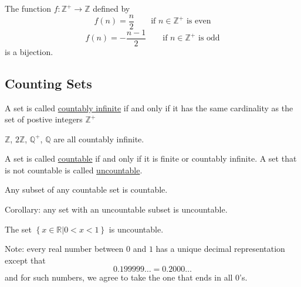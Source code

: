 The function $f:\mathbb Z^+ \rightarrow \mathbb Z$ defined by $$f(n) = \frac{n}{2}\qquad \text{if $n\in\mathbb Z^+$ is even}$$ $$f(n) = -\frac{n-1}{2}\qquad \text{if $n\in\mathbb Z^+$ is odd}$$ is a bijection.

\subsection{Counting Sets}
\begin{definition}
    A set is called \underline{countably infinite} if and only if it has the same cardinality as the set of postive integers $\mathbb Z^+$
\end{definition}

\begin{example}
    $\mathbb Z$, $2\mathbb Z$, $\mathbb Q^+$, $\mathbb Q$ are all countably infinite.
\end{example}

\begin{definition}
    A set is called \underline{countable} if and only if it is finite or countably infinite. A set that is not countable is called \underline{uncountable}.
\end{definition}
\begin{theorm}
    Any subset of any countable set is countable.
\end{theorm}

Corollary: any set with an uncountable subset is uncountable.

\begin{theorm}
    The set $\left\{x\in\mathbb R | 0 < x < 1\right\}$ is uncountable.
\end{theorm}

Note: every real number between $0$ and $1$ has a unique decimal representation except that $$0.199999\dots = 0.2000\dots$$ and for such numbers, we agree to take the one that ends in all $0$'s.

